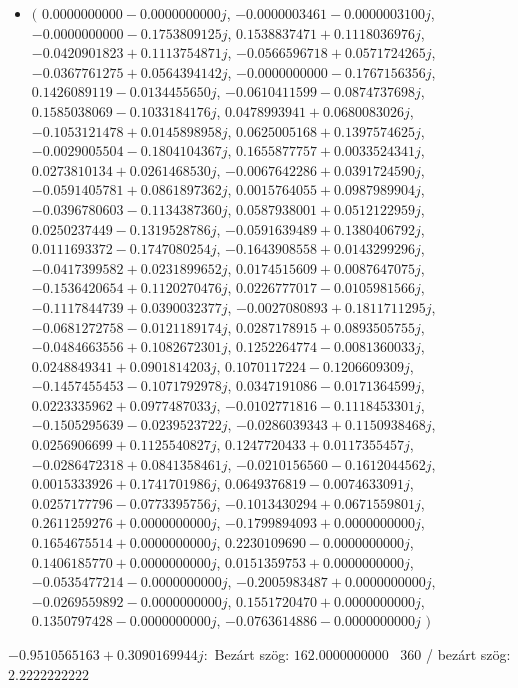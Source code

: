 \documentclass[14pt,a4paper]{article}
\begin{document}
\begin{itemize}
\item
$\big($
$0.0000000000-0.0000000000j$, $-0.0000003461-0.0000003100j$, $-0.0000000000-0.1753809125j$, $0.1538837471+0.1118036976j$, $-0.0420901823+0.1113754871j$, $-0.0566596718+0.0571724265j$, $-0.0367761275+0.0564394142j$, $-0.0000000000-0.1767156356j$, $0.1426089119-0.0134455650j$, $-0.0610411599-0.0874737698j$, $0.1585038069-0.1033184176j$, $0.0478993941+0.0680083026j$, $-0.1053121478+0.0145898958j$, $0.0625005168+0.1397574625j$, $-0.0029005504-0.1804104367j$, $0.1655877757+0.0033524341j$, $0.0273810134+0.0261468530j$, $-0.0067642286+0.0391724590j$, $-0.0591405781+0.0861897362j$, $0.0015764055+0.0987989904j$, $-0.0396780603-0.1134387360j$, $0.0587938001+0.0512122959j$, $0.0250237449-0.1319528786j$, $-0.0591639489+0.1380406792j$, $0.0111693372-0.1747080254j$, $-0.1643908558+0.0143299296j$, $-0.0417399582+0.0231899652j$, $0.0174515609+0.0087647075j$, $-0.1536420654+0.1120270476j$, $0.0226777017-0.0105981566j$, $-0.1117844739+0.0390032377j$, $-0.0027080893+0.1811711295j$, $-0.0681272758-0.0121189174j$, $0.0287178915+0.0893505755j$, $-0.0484663556+0.1082672301j$, $0.1252264774-0.0081360033j$, $0.0248849341+0.0901814203j$, $0.1070117224-0.1206609309j$, $-0.1457455453-0.1071792978j$, $0.0347191086-0.0171364599j$, $0.0223335962+0.0977487033j$, $-0.0102771816-0.1118453301j$, $-0.1505295639-0.0239523722j$, $-0.0286039343+0.1150938468j$, $0.0256906699+0.1125540827j$, $0.1247720433+0.0117355457j$, $-0.0286472318+0.0841358461j$, $-0.0210156560-0.1612044562j$, $0.0015333926+0.1741701986j$, $0.0649376819-0.0074633091j$, $0.0257177796-0.0773395756j$, $-0.1013430294+0.0671559801j$, $0.2611259276+0.0000000000j$, $-0.1799894093+0.0000000000j$, $0.1654675514+0.0000000000j$, $0.2230109690-0.0000000000j$, $0.1406185770+0.0000000000j$, $0.0151359753+0.0000000000j$, $-0.0535477214-0.0000000000j$, $-0.2005983487+0.0000000000j$, $-0.0269559892-0.0000000000j$, $0.1551720470+0.0000000000j$, $0.1350797428-0.0000000000j$, $-0.0763614886-0.0000000000j$
$\big)$
\end{itemize}
$-0.9510565163+0.3090169944j$:\
Bezárt szög: $162.0000000000$ \
360 / bezárt szög: $2.2222222222$\
\end{document}
